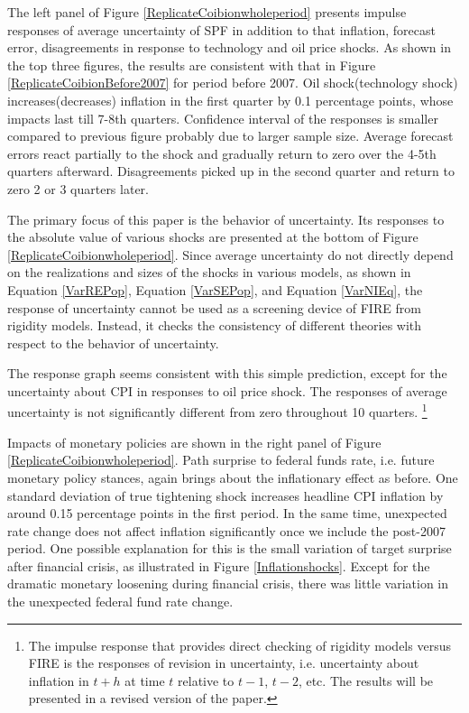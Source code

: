 \documentclass[12pt]{article}
\begin{document}
	The left panel of  Figure \ref{ReplicateCoibionwholeperiod} presents impulse responses of average uncertainty of SPF in addition to that inflation, forecast error, disagreements in response to technology and oil price shocks. As shown in the top three figures, the results are consistent with that in Figure \ref{ReplicateCoibionBefore2007} for period before 2007.  Oil shock(technology shock) increases(decreases) inflation in the first quarter by 0.1 percentage  points, whose impacts last till 7-8th quarters. Confidence interval of the responses is smaller compared to previous figure probably due to larger sample size.  Average forecast errors react partially to the shock and gradually return to zero over the 4-5th quarters afterward. Disagreements picked up in the second quarter and return to zero 2 or 3 quarters  later. 
	
	
	The primary focus of this paper is the behavior of uncertainty. Its responses to the absolute value of various shocks are presented at the bottom of Figure \ref{ReplicateCoibionwholeperiod}. Since average uncertainty do not directly depend on the realizations and sizes of the shocks in various models, as shown in Equation \ref{VarREPop},  Equation \ref{VarSEPop}, and Equation \ref{VarNIEq}, the response of uncertainty cannot be used as a screening device of  FIRE from rigidity models. Instead, it checks the consistency of different theories with respect to the behavior of uncertainty.  
	
	The response graph seems consistent with this simple prediction, except for the uncertainty about CPI in responses to oil price shock. The responses of average uncertainty is not significantly different from zero throughout 10 quarters. \footnote{The impulse response that provides direct checking of rigidity models versus FIRE is the responses of revision in uncertainty, i.e. uncertainty about inflation in $t+h$ at time $t$ relative to $t-1$, $t-2$, etc. The results will be presented in a revised version of the paper.} 
	
	Impacts of monetary policies are shown in the right panel of Figure \ref{ReplicateCoibionwholeperiod}. Path surprise to federal funds rate, i.e. future monetary policy stances, again brings about the inflationary effect as before. One standard deviation of true tightening shock increases headline CPI inflation by around 0.15 percentage points in the first period.  In the same time, unexpected rate change does not affect inflation significantly once we include the post-2007 period.  One possible explanation for this is the small variation of target surprise after financial crisis, as illustrated in Figure \ref{Inflationshocks}. Except for the dramatic monetary loosening during financial crisis, there was little variation in the unexpected federal fund rate change.  
	
\end{document}
